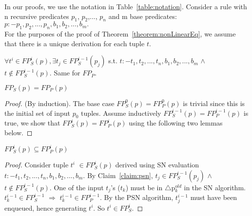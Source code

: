 

In our proofs, we use the notation in
Table~\ref{table:notation}. Consider a rule with n recursive predicates $p_{1}$, $p_{2}$,...,
$p_{n}$ and m base predicates:\\ 
\noindent $p :- p_{1}, p_{2}, ..., p_{n}, b_{1}, b_{2}, ..., b_{m}.$\\

For the purposes of the proof of Theorem~\ref{theorem:nonLinearEq}, we
assume that there is a unique derivation for each tuple $t$. 

\begin{Claim}\label{claim:psn} $\forall t^{i} \in FP_{S}^{i}(p), \exists t_{j} \in
  FP_{S}^{i-1}(p_{j})$ s.t. $t :- t_{1},
  t_{2},...,t_{n}, b_{1}, b_{2}, ...,b_{m}$ $\wedge$ $t
  \notin FP_{S}^{i-1}(p)$. Same for $FP_{P}$. 
\end{Claim}

\begin{Theorem}\label{theorem:nonLinearEq}$FP_{S}(p)=FP_{P}(p)$\end{Theorem}
\begin{proof} (By induction). The base case $FP_{S}^{0}(p) = FP_{P}^{0}(p)$ is trivial since this is
the initial set of input $p_{0}$ tuples. Assume inductively $FP_{S}^{i-1}(p)=FP_{P}^{i-1}(p)$ is true, we show
that $FP_{S}^{i}(p)=FP_{P}^{i}(p)$ using the following two lemmas below.
\end{proof}

\begin{Lem}\label{lem:psn1}$FP_{S}^{i}(p) \subseteq FP_{P}^{i}(p)$ \end{Lem}
\begin{proof} Consider tuple $t^{i}$ $\in FP_{S}^{i}(p)$
  derived using SN evaluation $t :- t_{1},t_{2},...,t_{n},b_{1}, b_{2},
  ...,b_{m}$. By Claim~\ref{claim:psn}, $t_{j} \in FP_{S}^{i-1}(p_{j})$ $\wedge$ $t
  \notin FP_{S}^{i-1}(p)$.  One of the input $t_{j}$'s ($t_{k}$) must be in
  $\triangle$p$_{k}^{old}$ in the SN algorithm. $t_{k}^{i-1} \in
  FP_{S}^{i-1}$ $\Rightarrow$ $t_{k}^{i-1} \in FP_{P}^{i-1}$. By the PSN
  algorithm, $t_{j}^{i-1}$ must have been enqueued, hence generating
  $t^{i}$. So $t^{i} \in FP_{S}^{i}$. 
\end{proof}


